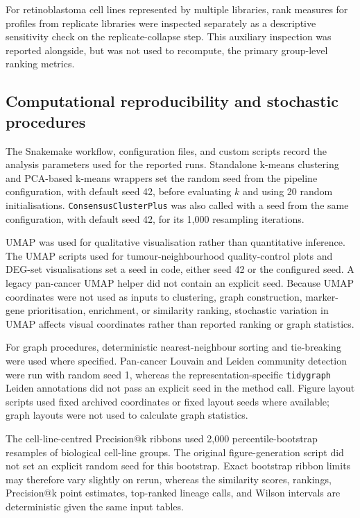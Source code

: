 For retinoblastoma cell lines represented by multiple libraries, rank measures
for profiles from replicate libraries were inspected separately as a
descriptive sensitivity check on the replicate-collapse step. This auxiliary
inspection was reported alongside, but was not used to recompute, the primary
group-level ranking metrics.

\subsection{Computational reproducibility and stochastic procedures}

The Snakemake workflow, configuration files, and custom scripts record the
analysis parameters used for the reported runs. Standalone k-means clustering
and PCA-based k-means wrappers set the random seed from the pipeline
configuration, with default seed 42, before evaluating \(k\) and using 20 random
initialisations. \texttt{ConsensusClusterPlus} was also called with a seed from
the same configuration, with default seed 42, for its 1{,}000 resampling
iterations.

UMAP was used for qualitative visualisation rather than quantitative inference.
The UMAP scripts used for tumour-neighbourhood quality-control plots and
DEG-set visualisations set a seed in code, either seed 42 or the configured seed.
A legacy pan-cancer UMAP helper did not contain an explicit seed. Because UMAP
coordinates were not used as inputs to clustering, graph construction,
marker-gene prioritisation, enrichment, or similarity ranking, stochastic
variation in UMAP affects visual coordinates rather than reported ranking or
graph statistics.

For graph procedures, deterministic nearest-neighbour sorting and tie-breaking
were used where specified. Pan-cancer Louvain and Leiden community detection
were run with random seed 1, whereas the representation-specific
\texttt{tidygraph} Leiden annotations did not pass an explicit seed in the
method call. Figure layout scripts used fixed archived coordinates or fixed
layout seeds where available; graph layouts were not used to calculate graph
statistics.

The cell-line-centred Precision@k ribbons used 2{,}000 percentile-bootstrap
resamples of biological cell-line groups. The original figure-generation script
did not set an explicit random seed for this bootstrap. Exact bootstrap ribbon
limits may therefore vary slightly on rerun, whereas the similarity scores,
rankings, Precision@k point estimates, top-ranked lineage calls, and Wilson
intervals are deterministic given the same input tables.

